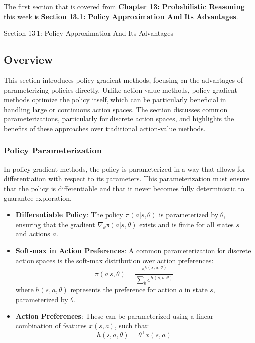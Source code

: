The first section that is covered from \textbf{Chapter 13: Probabilistic Reasoning} this week is \textbf{Section 13.1: Policy Approximation And Its Advantages}.

\begin{notes}{Section 13.1: Policy Approximation And Its Advantages}
    \subsection*{Overview}

    This section introduces policy gradient methods, focusing on the advantages of parameterizing policies directly. Unlike action-value methods, policy gradient methods optimize the policy itself, which can 
    be particularly beneficial in handling large or continuous action spaces. The section discusses common parameterizations, particularly for discrete action spaces, and highlights the benefits of these 
    approaches over traditional action-value methods.
    
    \subsubsection*{Policy Parameterization}
    
    In policy gradient methods, the policy is parameterized in a way that allows for differentiation with respect to its parameters. This parameterization must ensure that the policy is differentiable and 
    that it never becomes fully deterministic to guarantee exploration.
    
    \begin{highlight}
    
        \begin{itemize}
            \item \textbf{Differentiable Policy}: The policy $\pi(a|s, \theta)$ is parameterized by $\theta$, ensuring that the gradient $\nabla_\theta \pi(a|s, \theta)$ exists and is finite for 
            all states $s$ and actions $a$.
            \item \textbf{Soft-max in Action Preferences}: A common parameterization for discrete action spaces is the soft-max distribution over action preferences:
            \[
            \pi(a|s, \theta) = \frac{e^{h(s,a,\theta)}}{\sum_b e^{h(s,b,\theta)}}
            \]
            where $h(s, a, \theta)$ represents the preference for action $a$ in state $s$, parameterized by $\theta$.
            \item \textbf{Action Preferences}: These can be parameterized using a linear combination of features $x(s, a)$, such that:
            \[
            h(s, a, \theta) = \theta^\top x(s, a)
            \]
        \end{itemize}
    

\end{highlight}
\end{notes}
